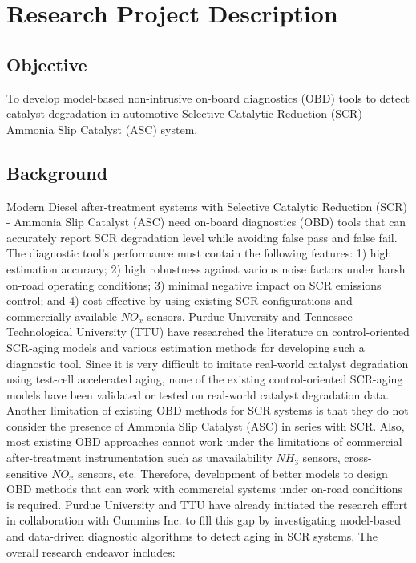 \section{Research Project Description}

\subsection{Objective}
To develop model-based non-intrusive on-board diagnostics (OBD) tools to detect
catalyst-degradation in automotive Selective Catalytic Reduction (SCR) - Ammonia
Slip Catalyst (ASC) system.

\subsection{Background}
Modern Diesel after-treatment systems with Selective Catalytic Reduction (SCR)
- Ammonia Slip Catalyst (ASC) need on-board diagnostics (OBD) tools that can
accurately report SCR degradation level while avoiding false pass and false
fail. The diagnostic tool's performance must contain the following features: 1)
high estimation accuracy; 2) high robustness against various noise factors
under harsh on-road operating conditions; 3) minimal negative impact on SCR
emissions control; and 4) cost-effective by using existing SCR configurations
and commercially available $NO_x$ sensors. Purdue University and Tennessee
Technological University (TTU) have researched the literature on
control-oriented SCR-aging models and various estimation methods for developing
such a diagnostic tool. Since it is very difficult to imitate real-world
catalyst degradation using test-cell accelerated aging, none of the existing
control-oriented SCR-aging models have been validated or tested on real-world
catalyst degradation data. Another limitation of existing OBD methods for SCR
systems is that they do not consider the presence of Ammonia Slip Catalyst
(ASC) in series with SCR. Also, most existing OBD approaches cannot work under
the limitations of commercial after-treatment instrumentation such as
unavailability $NH_3$ sensors, cross-sensitive $NO_x$ sensors, etc. Therefore,
development of better models to design OBD methods that can work with
commercial systems under on-road conditions is required. Purdue University and
TTU have already initiated the research effort in collaboration with Cummins
Inc. to fill this gap by investigating model-based and data-driven diagnostic
algorithms to detect aging in SCR systems. The overall research endeavor
includes:

